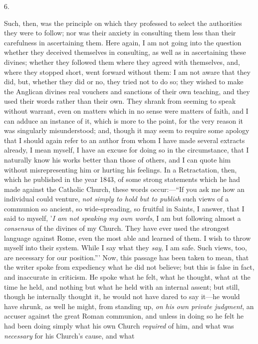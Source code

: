 6.

Such, then, was the principle on which they professed to select the
authorities they were to follow; nor was their anxiety in consulting
them less than their carefulness in ascertaining them. Here again, I
am not going into the question whether they deceived themselves in
consulting, as well as in ascertaining these divines; whether they
followed them where they agreed with themselves, and, where they
stopped short, went forward without them: I am not aware that they
did, but, whether they did or no, they tried not to do so; they wished
to make the Anglican divines real vouchers and sanctions of their own
teaching, and they used their words rather than their own. They shrank
from seeming to speak without warrant, even on matters which in no
sense were matters of faith, and I can adduce an instance of it, which
is more to the point, for the very reason it was singularly
misunderstood; and, though it may seem to require some apology that I
should again refer to an author from whom I have made several extracts
already, I mean myself, I have an excuse for doing so in the
circumstance, that I naturally know his works better than those of
others, and I can quote him without misrepresenting him or hurting his
feelings. In a Retractation, then, which he published in the year
1843, of some strong statements which he had made against the Catholic
Church, these words occur:—``If you ask me how an individual
could venture, \emph{not simply to hold but to publish} such views of
a communion so ancient, so wide-spreading, so fruitful in Saints, I
answer, that I said to myself, '\emph{I am not speaking my own words},
I am but following almost a \emph{consensus} of the divines of my Church.
They have ever used the strongest language against Rome, even the most
able and learned of them. I wish to throw myself into their system.
While I say what they \emph{say}, I am safe. Such views, too, are
necessary for our position.''' Now, this passage has been taken to
mean, that the writer spoke from expediency what he did not believe;
but this is false in fact, and inaccurate in criticism. He spoke what
he felt, what he thought, what at the time he held, and nothing but
what he held with an internal assent; but still, though he internally
thought it, he would not have dared to say it—he would have shrunk,
as well he might, from standing up, \emph{on his own private judgment},
an accuser against the great Roman communion, and unless in doing so
he felt he had been doing simply what his own Church \emph{required}
of him, and what was \emph{necessary} for his Church's cause, and what
